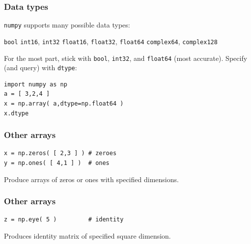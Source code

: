 \documentclass[11pt]{beamer}
\begin{document}
\begin{frame}[fragile]
  \frametitle{Data types}
  \Enlarge

  \begin{enumerate}
  \myitem  \texttt{numpy} supports many possible data types:
    \begin{enumerate}
    \mysubitem  \texttt{bool}
    \mysubitem  \texttt{int16}, \texttt{int32}
    \mysubitem  \texttt{float16}, \texttt{float32}, \texttt{float64}
    \mysubitem  \texttt{complex64}, \texttt{complex128}
    \end{enumerate} %
  \myitem  For the most part, stick with \texttt{bool}, \texttt{int32}, and \texttt{float64} (most accurate).
  \myitem  Specify (and query) with \texttt{dtype}:
  \end{enumerate}
  \begin{Verbatim}
import numpy as np
a = [ 3,2,4 ]
x = np.array( a,dtype=np.float64 )
x.dtype
  \end{Verbatim}
\end{frame}

\begin{frame}[fragile]
  \frametitle{Other arrays}
  \Enlarge

  \begin{Verbatim}
x = np.zeros( [ 2,3 ] ) # zeroes
y = np.ones( [ 4,1 ] )  # ones
  \end{Verbatim}
  \begin{enumerate}
  \myitem  Produce arrays of zeros or ones with specified dimensions.
  \end{enumerate}
\end{frame}

\begin{frame}[fragile]
  \frametitle{Other arrays}
  \Enlarge

  \begin{Verbatim}
z = np.eye( 5 )         # identity
  \end{Verbatim}
  \begin{enumerate}
  \myitem  Produces identity matrix of specified square dimension.
  \end{enumerate}
\end{frame}
\end{document}
